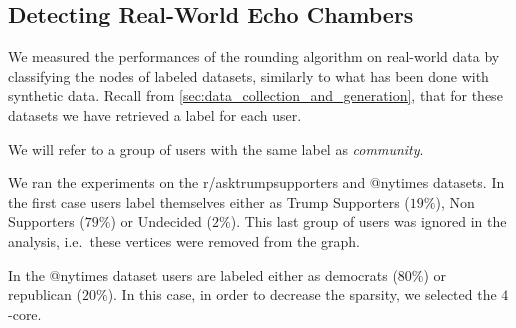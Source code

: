 \subsection{Detecting Real-World Echo Chambers}%
\label{sub:detecting_real_echo_chambers}

We measured the performances of the rounding algorithm on real-world data by
classifying the nodes of labeled datasets, similarly to what has been done
with synthetic data. Recall from \autoref{sec:data_collection_and_generation},
that for these datasets we have retrieved a label for each user.

We will refer to a group of users with the same label as \emph{community}.

We ran the experiments on the r/asktrumpsupporters and
@nytimes datasets. In the first case users label themselves either as Trump Supporters ($19\%$), Non
Supporters ($79\%$) or Undecided ($2\%$). This last group of users was ignored
in the analysis, i.e.\ these vertices were removed from the graph.

In the @nytimes dataset users are labeled either as democrats ($80\%$) or republican
($20\%$). In this case, in order to decrease the sparsity, we selected the
$4$-core.


